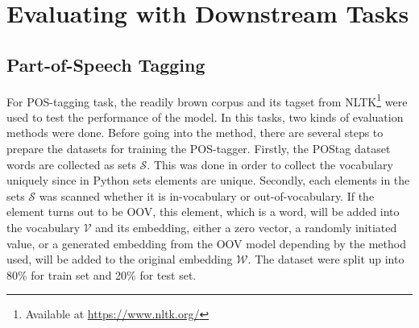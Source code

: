 
    
\section{Evaluating with Downstream Tasks}
    \subsection{Part-of-Speech Tagging}
        For POS-tagging task, the readily brown corpus and its tagset
        from NLTK\footnote{Available at \url{https://www.nltk.org/}}
        were used to test the performance of the model. In this tasks,
        two kinds of evaluation methods were done. Before going into
        the method, there are several steps to prepare the datasets
        for training the POS-tagger. Firstly, the POStag dataset words
        are collected as sets $\mathcal{S}$. This was done in order to
        collect the vocabulary uniquely since in Python sets elements
        are unique. Secondly, each elements in the sets $\mathcal{S}$
        was scanned whether it is in-vocabulary or out-of-vocabulary.
        If the element turns out to be OOV, this element, which is a
        word, will be added into the vocabulary $\mathcal{V}$ and its
        embedding, either a zero vector, a randomly initiated value,
        or a generated embedding from the OOV model depending by the
        method used, will be added to the original embedding
        $\mathcal{W}$. The dataset were split up into 80\% for train set
        and 20\%  for test set.
        
